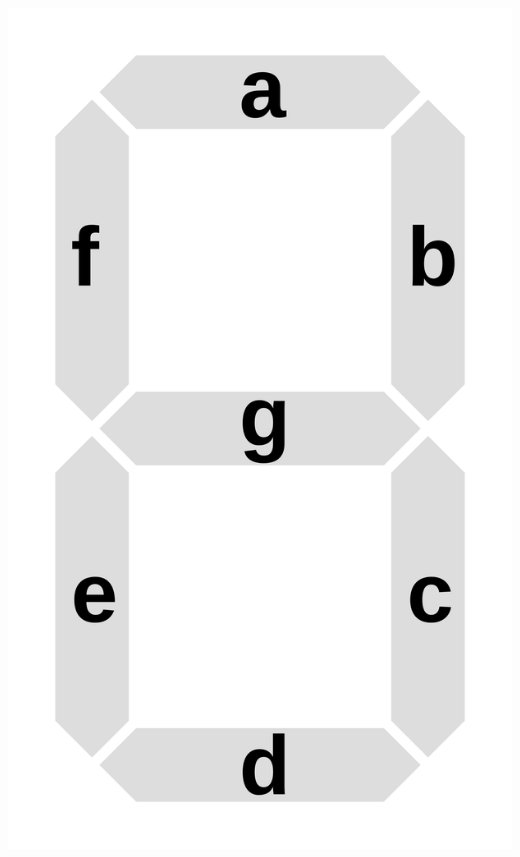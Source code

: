 \documentclass[12pt,a4paper]{article}
\begin{document}
\centering
\includegraphics[scale=0.07]{7seg/segconf}
\end{document}
